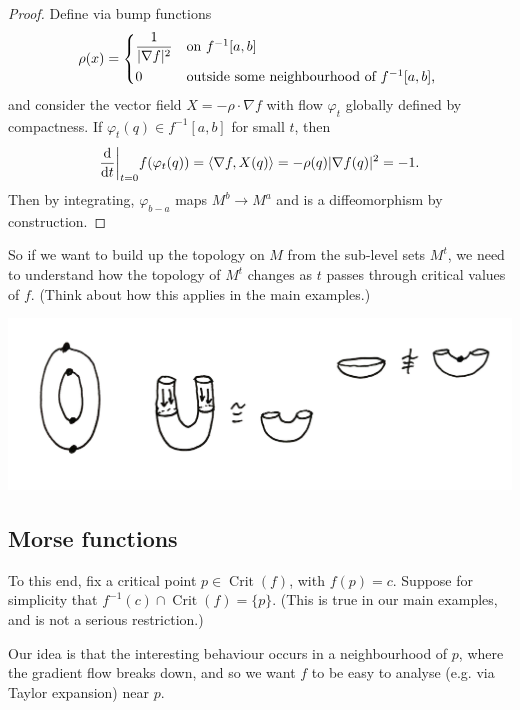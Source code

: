 \documentclass{article}
\theoremstyle{definition}
\DeclareMathOperator{\Crit}{Crit}
\begin{document}
\begin{proof}
    Define via bump functions
    \begin{equation*}
        \rho(x) = \begin{dcases*}
            \frac{1}{|\nabla f|^2} & on $f^{-1}[a,b]$ \\
            0 & outside some neighbourhood of $f^{-1}[a,b]$,
        \end{dcases*}
    \end{equation*}
    and consider the vector field $X=-\rho\cdot\nabla f$ with flow $\varphi_t$
    globally defined by compactness. If $\varphi_t(q)\in f^{-1}[a,b]$ for small
    $t$, then
    \begin{equation*}
        \odv{}{t}\biggr\vert_{t=0}f(\varphi_t(q))
            = \langle\nabla f,X(q)\rangle
            = -\rho(q)|\nabla f(q)|^2
            = -1.
    \end{equation*}
    Then by integrating, $\varphi_{b-a}$ maps $M^b\to M^a$ and is a
    diffeomorphism by construction.
\end{proof}

So if we want to build up the topology on $M$ from the sub-level sets $M^t$, we
need to understand how the topology of $M^t$ changes as $t$ passes through
critical values of $f$. (Think about how this applies in the main examples.)

\begin{center}
    \includegraphics[scale=0.1]{morse_steps}
\end{center}

\subsection*{Morse functions}

To this end, fix a critical point $p\in\Crit(f)$, with $f(p)=c$. Suppose for
simplicity that $f^{-1}(c)\cap\Crit(f)=\{p\}$. (This is true in our main
examples, and is not a serious restriction.)

Our idea is that the interesting behaviour occurs in a neighbourhood of $p$,
where the gradient flow breaks down, and so we want $f$ to be easy to analyse
(e.g. via Taylor expansion) near $p$.
\end{document}
